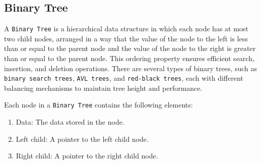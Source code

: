 

\subsection{Binary Tree}

A \lstinline{Binary Tree} is a hierarchical data structure in which each node has at most two child nodes, arranged in a way that the value of the node to the left is less than or equal to the parent node and the value of the node to the right is greater than or equal to the parent node. This ordering property ensures efficient search, insertion, and deletion operations. There are several types of binary trees, such as \lstinline{binary search trees}, \lstinline{AVL trees}, and \lstinline{red-black trees}, each with different balancing mechanisms to maintain tree height and performance.

Each node in a \lstinline{Binary Tree} contains the following elements:
\begin{enumerate}
    \item Data: The data stored in the node.
    \item Left child: A pointer to the left child node.
    \item Right child: A pointer to the right child node.
\end{enumerate}

